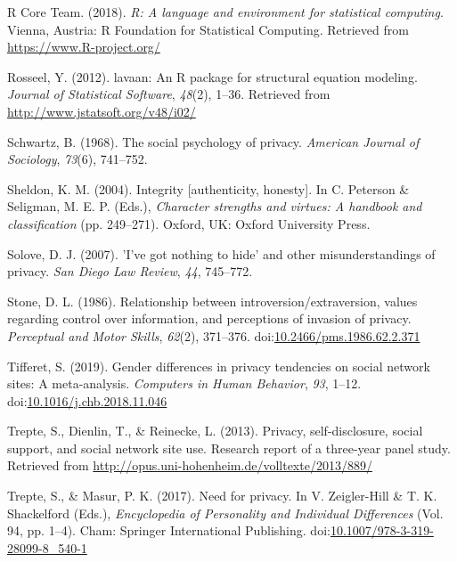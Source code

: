 \documentclass[man,floatsintext]{apa6}
\theoremstyle{definition}
\theoremstyle{definition}
\theoremstyle{definition}
\theoremstyle{remark}
\begin{document}
\leavevmode\hypertarget{ref-R-base}{}%
R Core Team. (2018). \emph{R: A language and environment for statistical
computing}. Vienna, Austria: R Foundation for Statistical Computing.
Retrieved from \url{https://www.R-project.org/}

\leavevmode\hypertarget{ref-R-lavaan}{}%
Rosseel, Y. (2012). lavaan: An R package for structural equation
modeling. \emph{Journal of Statistical Software}, \emph{48}(2), 1--36.
Retrieved from \url{http://www.jstatsoft.org/v48/i02/}

\leavevmode\hypertarget{ref-Schwartz.1968}{}%
Schwartz, B. (1968). The social psychology of privacy. \emph{American
Journal of Sociology}, \emph{73}(6), 741--752.

\leavevmode\hypertarget{ref-Sheldon.2004}{}%
Sheldon, K. M. (2004). Integrity {[}authenticity, honesty{]}. In C.
Peterson \& Seligman, M. E. P. (Eds.), \emph{Character strengths and
virtues: A handbook and classification} (pp. 249--271). Oxford, UK:
Oxford University Press.

\leavevmode\hypertarget{ref-Solove.2007}{}%
Solove, D. J. (2007). 'I've got nothing to hide' and other
misunderstandings of privacy. \emph{San Diego Law Review}, \emph{44},
745--772.

\leavevmode\hypertarget{ref-Stone.1986}{}%
Stone, D. L. (1986). Relationship between introversion/extraversion,
values regarding control over information, and perceptions of invasion
of privacy. \emph{Perceptual and Motor Skills}, \emph{62}(2), 371--376.
doi:\href{https://doi.org/10.2466/pms.1986.62.2.371}{10.2466/pms.1986.62.2.371}

\leavevmode\hypertarget{ref-Tifferet.2019}{}%
Tifferet, S. (2019). Gender differences in privacy tendencies on social
network sites: A meta-analysis. \emph{Computers in Human Behavior},
\emph{93}, 1--12.
doi:\href{https://doi.org/10.1016/j.chb.2018.11.046}{10.1016/j.chb.2018.11.046}

\leavevmode\hypertarget{ref-Trepte.2013a}{}%
Trepte, S., Dienlin, T., \& Reinecke, L. (2013). Privacy,
self-disclosure, social support, and social network site use. Research
report of a three-year panel study. Retrieved from
\url{http://opus.uni-hohenheim.de/volltexte/2013/889/}

\leavevmode\hypertarget{ref-Trepte.2017d}{}%
Trepte, S., \& Masur, P. K. (2017). Need for privacy. In V. Zeigler-Hill
\& T. K. Shackelford (Eds.), \emph{Encyclopedia of Personality and
Individual Differences} (Vol. 94, pp. 1--4). Cham: Springer
International Publishing.
doi:\href{https://doi.org/10.1007/978-3-319-28099-8_540-1}{10.1007/978-3-319-28099-8\_540-1}
\end{document}
